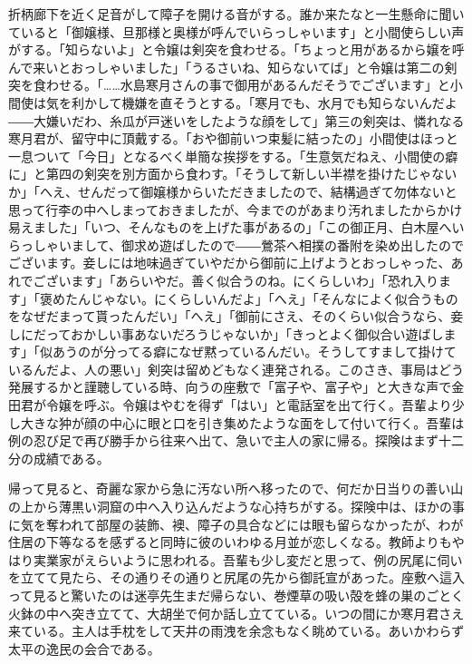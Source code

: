 \documentclass[12pt, openright]{book}
\begin{document}
折柄廊下を近く足音がして障子を開ける音がする。誰か来たなと一生懸命に聞いていると「御嬢様、旦那様と奥様が呼んでいらっしゃいます」と小間使らしい声がする。「知らないよ」と令嬢は剣突を食わせる。「ちょっと用があるから嬢を呼んで来いとおっしゃいました」「うるさいね、知らないてば」と令嬢は第二の剣突を食わせる。「\ldots{}\ldots{}水島寒月さんの事で御用があるんだそうでございます」と小間使は気を利かして機嫌を直そうとする。「寒月でも、水月でも知らないんだよ――大嫌いだわ、糸瓜が戸迷いをしたような顔をして」第三の剣突は、憐れなる寒月君が、留守中に頂戴する。「おや御前いつ束髪に結ったの」小間使はほっと一息ついて「今日」となるべく単簡な挨拶をする。「生意気だねえ、小間使の癖に」と第四の剣突を別方面から食わす。「そうして新しい半襟を掛けたじゃないか」「へえ、せんだって御嬢様からいただきましたので、結構過ぎて勿体ないと思って行李の中へしまっておきましたが、今までのがあまり汚れましたからかけ易えました」「いつ、そんなものを上げた事があるの」「この御正月、白木屋へいらっしゃいまして、御求め遊ばしたので――鶯茶へ相撲の番附を染め出したのでございます。妾しには地味過ぎていやだから御前に上げようとおっしゃった、あれでございます」「あらいやだ。善く似合うのね。にくらしいわ」「恐れ入ります」「褒めたんじゃない。にくらしいんだよ」「へえ」「そんなによく似合うものをなぜだまって貰ったんだい」「へえ」「御前にさえ、そのくらい似合うなら、妾しにだっておかしい事あないだろうじゃないか」「きっとよく御似合い遊ばします」「似あうのが分ってる癖になぜ黙っているんだい。そうしてすまして掛けているんだよ、人の悪い」剣突は留めどもなく連発される。このさき、事局はどう発展するかと謹聴している時、向うの座敷で「富子や、富子や」と大きな声で金田君が令嬢を呼ぶ。令嬢はやむを得ず「はい」と電話室を出て行く。吾輩より少し大きな狆が顔の中心に眼と口を引き集めたような面をして付いて行く。吾輩は例の忍び足で再び勝手から往来へ出て、急いで主人の家に帰る。探険はまず十二分の成績である。

帰って見ると、奇麗な家から急に汚ない所へ移ったので、何だか日当りの善い山の上から薄黒い洞窟の中へ入り込んだような心持ちがする。探険中は、ほかの事に気を奪われて部屋の装飾、襖、障子の具合などには眼も留らなかったが、わが住居の下等なるを感ずると同時に彼のいわゆる月並が恋しくなる。教師よりもやはり実業家がえらいように思われる。吾輩も少し変だと思って、例の尻尾に伺いを立てて見たら、その通りその通りと尻尾の先から御託宣があった。座敷へ這入って見ると驚いたのは迷亭先生まだ帰らない、巻煙草の吸い殻を蜂の巣のごとく火鉢の中へ突き立てて、大胡坐で何か話し立てている。いつの間にか寒月君さえ来ている。主人は手枕をして天井の雨洩を余念もなく眺めている。あいかわらず太平の逸民の会合である。
\end{document}
